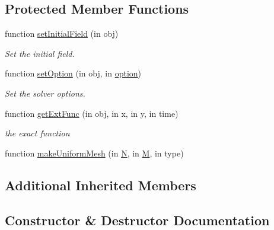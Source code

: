 \subsection*{Protected Member Functions}
\begin{DoxyCompactItemize}
\item 
function \hyperlink{class_adv_rotation_uniform_mesh2d_a4bb0abb7777c337b2670d190f119b8b0}{set\+Initial\+Field} (in obj)
\begin{DoxyCompactList}\small\item\em Set the initial field. \end{DoxyCompactList}\item 
function \hyperlink{class_adv_rotation_uniform_mesh2d_a5cc1bad0350cdc9da1d628bd2344b40e}{set\+Option} (in obj, in \hyperlink{class_ndg_phys_af91f4c54b93504e76b38a5693774dff1}{option})
\begin{DoxyCompactList}\small\item\em Set the solver options. \end{DoxyCompactList}\item 
function \hyperlink{class_adv_rotation_uniform_mesh2d_a59422e4911f651f1e41901c8bb0ecc1d}{get\+Ext\+Func} (in obj, in x, in y, in time)
\begin{DoxyCompactList}\small\item\em the exact function \end{DoxyCompactList}\item 
function \hyperlink{class_adv_rotation_uniform_mesh2d_a8fa2466a607b2cb9f44e1b6c3d5d6378}{make\+Uniform\+Mesh} (in \hyperlink{class_adv_rotation_uniform_mesh2d_a10a366e7084faf231cd15555c8f48956}{N}, in \hyperlink{class_adv_rotation_uniform_mesh2d_a6ae00c25344d111a585e32e30954b63b}{M}, in type)
\end{DoxyCompactItemize}
\subsection*{Additional Inherited Members}


\subsection{Constructor \& Destructor Documentation}
\mbox{\label{class_adv_rotation_uniform_mesh2d_a97836190205ea9f52a1d88fb0bcf5af3}} 
